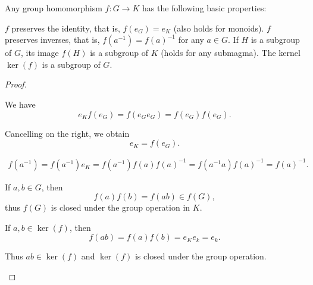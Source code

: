 \begin{proposition}\label{thm:group_homomorphism_properties}
  Any group homomorphism \( f: G \to K \) has the following basic properties:
  \begin{defenum}
     \( f \) preserves the identity, that is, \( f(e_G) = e_K \) (also holds for monoids).
     \( f \) preserves inverses, that is, \( f(a^{-1}) = f(a)^{-1} \) for any \( a \in G \).
     If \( H \) is a subgroup of \( G \), its image \( f(H) \) is a subgroup of \( K \) (holds for any submagma).
     The kernel \( \ker(f) \) is a subgroup of \( G \).
  \end{defenum}
\end{proposition}
\begin{proof}\mbox{}
  \begin{itemize}
     We have
    \begin{equation*}
      e_K f(e_G) = f(e_G e_G) = f(e_G) f(e_G).
    \end{equation*}

    Cancelling on the right, we obtain
    \begin{equation*}
      e_K = f(e_G).
    \end{equation*}

    \begin{align*}
      f(a^{-1})
      =
      f(a^{-1}) e_K
      =
      f(a^{-1}) f(a) f(a)^{-1}
      =
      f(a^{-1} a) f(a)^{-1}
      =
      f(a)^{-1}.
    \end{align*}

     If \( a, b \in G \), then
    \begin{equation*}
      f(a) f(b) = f(ab) \in f(G),
    \end{equation*}
    thus \( f(G) \) is closed under the group operation in \( K \).

     If \( a, b \in \ker(f) \), then
    \begin{equation*}
      f(ab) = f(a) f(b) = e_K e_k = e_k.
    \end{equation*}

    Thus \( ab \in \ker(f) \) and \( \ker(f) \) is closed under the group operation.
  \end{itemize}
\end{proof}

